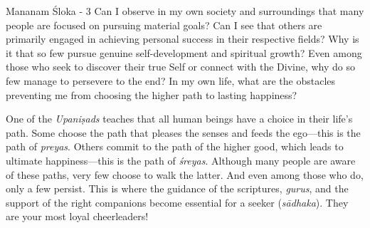 


\newpage
\begin{mananam}{\mananamfont Mananam Śloka - 3}
\normalfont\mananamtext Can I observe in my own society and surroundings that many people are focused on pursuing material goals? Can I see that others are primarily engaged in achieving personal success in their respective fields? Why is it that so few pursue genuine self-development and spiritual growth? Even among those who seek to discover their true Self or connect with the Divine, why do so few manage to persevere to the end? In my own life, what are the obstacles preventing me from choosing the higher path to lasting happiness?
\end{mananam}
\sreflect
\begin{inspiration}{}
  \normalfont\mananamtext One of the \emph{Upaniṣads} teaches that all human beings have a choice in their life’s path. Some choose the path that pleases the senses and feeds the ego—this is the path of \emph{preyas}. Others commit to the path of the higher good, which leads to ultimate happiness—this is the path of \emph{śreyas}. Although many people are aware of these paths, very few choose to walk the latter. And even among those who do, only a few persist. This is where the guidance of the scriptures, \emph{gurus}, and the support of the right companions become essential for a seeker (\emph{sādhaka}). They are your most loyal cheerleaders!
\end{inspiration}
\newpage

